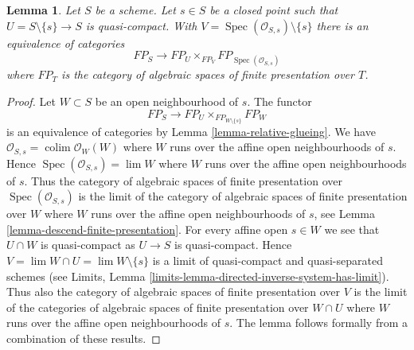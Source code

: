 \documentclass{stacks-project}
\theoremstyle{plain}
\newtheorem{lemma}[subsection]{Lemma}
\theoremstyle{definition}
\theoremstyle{remark}
\numberwithin{equation}{subsection}
\def\lim{\mathop{\mathrm{lim}}\nolimits}
\def\colim{\mathop{\mathrm{colim}}\nolimits}
\def\Spec{\mathop{\mathrm{Spec}}}
\begin{document}
\begin{lemma}
\label{lemma-glueing-near-closed-point}
Let $S$ be a scheme. Let $s \in S$ be a closed point such that
$U = S \setminus \{s\} \to S$ is quasi-compact. With
$V = \Spec(\mathcal{O}_{S, s}) \setminus \{s\}$ there is
an equivalence of categories
$$
FP_S \longrightarrow FP_U \times_{FP_V} FP_{\Spec(\mathcal{O}_{S, s})}
$$
where $FP_T$ is the category of algebraic spaces of finite presentation
over $T$.
\end{lemma}

\begin{proof}
Let $W \subset S$ be an open neighbourhood of $s$. The functor
$$
FP_S \to FP_U \times_{FP_{W \setminus \{s\}}} FP_W
$$
is an equivalence of categories by Lemma \ref{lemma-relative-glueing}.
We have $\mathcal{O}_{S, s} = \colim \mathcal{O}_W(W)$ where
$W$ runs over the affine open neighbourhoods of $s$.
Hence $\Spec(\mathcal{O}_{S, s}) = \lim W$ where $W$
runs over the affine open neighbourhoods of $s$.
Thus the category of algebraic spaces of finite presentation
over $\Spec(\mathcal{O}_{S, s})$ is the limit of the
category of algebraic spaces of finite presentation over
$W$ where $W$ runs over the affine open neighbourhoods
of $s$, see
Lemma \ref{lemma-descend-finite-presentation}.
For every affine open $s \in W$ we see that $U \cap W$
is quasi-compact as $U \to S$ is quasi-compact.
Hence $V = \lim W \cap U = \lim W \setminus \{s\}$ is a limit of
quasi-compact and quasi-separated schemes (see
Limits, Lemma \ref{limits-lemma-directed-inverse-system-has-limit}).
Thus also the category of algebraic spaces of finite presentation
over $V$ is the limit of the
categories of algebraic spaces of finite presentation over
$W \cap U$ where $W$ runs over the affine open neighbourhoods
of $s$. The lemma follows formally from a combination
of these results.
\end{proof}
\end{document}
